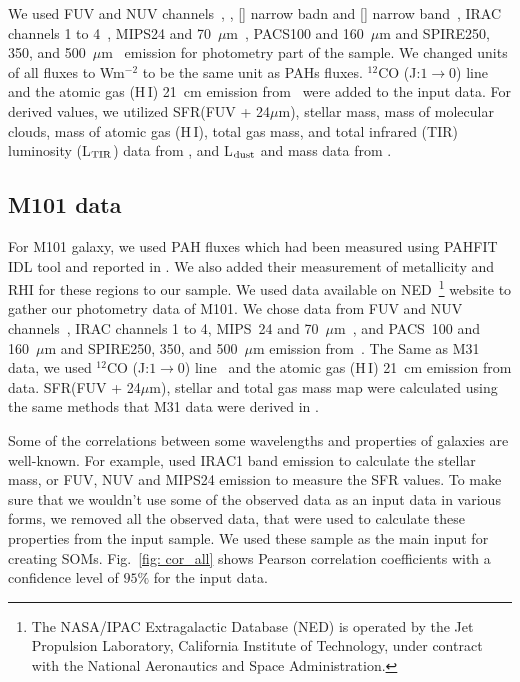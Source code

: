      We used \GALEX FUV and NUV channels~\citep{Martin05}, \halpha, [\sii] narrow badn and [\oiii] narrow band~\citep{Massey07}, IRAC channels 1 to 4~\citep{Barmby06}, MIPS24 and 70~$\mu$m~\citep{Gordon06}, PACS100 and 160~$\mu$m and SPIRE250, 350, and 500~$\mu$m~\citep{Fritz12} emission for photometry part of the sample.
     We changed units of all fluxes to Wm$^{-2}$ to be the same unit as PAHs fluxes.
     $^{12}$CO (J:$1\rightarrow0$) line~\citep{Nieten06} and the atomic gas (H\,{\sc I}) 21~cm emission from~\cite{Chemin09} were added to the input data. 
     For derived values, we utilized SFR(FUV + 24$\mu$m), stellar mass, mass of molecular clouds, mass of atomic gas (H\,{\sc I}), total gas mass, and total infrared (TIR) luminosity (L$_{\rm TIR}$) data from \cite{Rahmani16}, and L$_{\rm dust}$ and mass data from \cite{Draine14}.
     
    \subsection{M101 data}
    \label{Sec: data_M101_SOMN} 
     For M101 galaxy, we used PAH fluxes which had been measured using {\sc PAHFIT IDL} tool and reported in \cite{Gordon08}.
     We also added their measurement of metallicity and RHI for these regions to our sample.
     We used data available on NED~\footnote{The NASA/IPAC Extragalactic Database (NED) is operated by the Jet Propulsion Laboratory, California Institute of Technology, under contract with the National Aeronautics and Space Administration.} website to gather our photometry data of M101. 
     We chose data from \GALEX FUV and NUV channels~\citep{depaz07}, IRAC channels 1 to 4, MIPS~24 and 70~$\mu$m~\cite{Dale09}, and  PACS~100 and 160~$\mu$m and SPIRE250, 350, and 500~$\mu$m emission from~\cite{Kennicutt11}.
     The Same as M31 data, we used $^{12}$CO (J:$1\rightarrow0$) line~\citep{Helfer03} and the atomic gas (H\,{\sc I}) 21~cm emission from \cite{Walter08} data.
     SFR(FUV + 24$\mu$m), stellar and total gas mass map were calculated using the same methods that M31 data were derived in \cite{Rahmani16}.
     
      Some of the correlations between some wavelengths and properties of galaxies are well-known.
     For example, \citep{Rahmani16} used IRAC1 band emission to calculate the stellar mass, or FUV, NUV and MIPS24 emission to measure the SFR values. 
     To make sure that we wouldn't use some of the observed data as an input data in various forms, we removed all the observed data, that were used to calculate these properties from the input sample.
     We used these sample as the main input for creating SOMs.
     Fig.~\ref{fig: cor_all} shows Pearson correlation coefficients with a confidence level of $95\%$ for the input data.

